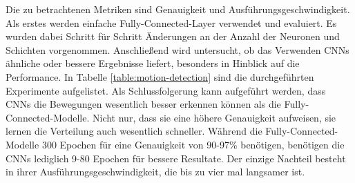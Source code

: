 Die zu betrachtenen Metriken sind Genauigkeit und
Aus\-führ\-ungs\-ge\-schwin\-dig\-keit. Als erstes werden einfache
Fully-Connected-Layer verwendet und evaluiert. Es wurden dabei Schritt für
Schritt Änderungen an der Anzahl der Neuronen und Schichten vorgenommen.
Anschließend wird untersucht, ob das Verwenden CNNs ähnliche oder bessere
Ergebnisse liefert, besonders in Hinblick auf die Performance. In Tabelle
\ref{table:motion-detection} sind die durchgeführten Experimente aufgelistet.
Als Schlussfolgerung kann aufgeführt werden, dass CNNs die Bewegungen wesentlich
besser erkennen können als die Fully-Connected-Modelle. Nicht nur, dass sie eine
höhere Genauigkeit aufweisen, sie lernen die Verteilung auch wesentlich
schneller. Während die Fully-Connected-Modelle 300 Epochen für eine Genauigkeit
von 90-97\% benötigen, benötigen die CNNs lediglich 9-80 Epochen für bessere
Resultate. Der einzige Nachteil besteht in ihrer Ausführungsgeschwindigkeit, die
bis zu vier mal langsamer ist.


